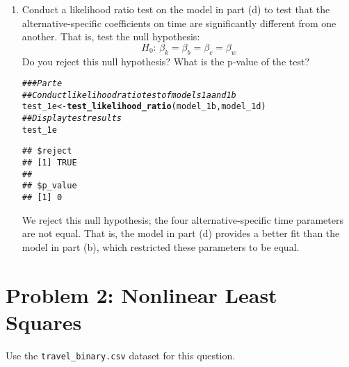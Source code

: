 \documentclass[11pt,letterpaper]{article}\usepackage[]{graphicx}\usepackage[]{color}
\makeatletter
\newcommand{\hlcom}[1]{\textcolor[rgb]{0.678,0.584,0.686}{\textit{#1}}}%
\newcommand{\hlstd}[1]{\textcolor[rgb]{0.345,0.345,0.345}{#1}}%
\newcommand{\hlkwb}[1]{\textcolor[rgb]{0.69,0.353,0.396}{#1}}%
\newcommand{\hlkwd}[1]{\textcolor[rgb]{0.737,0.353,0.396}{\textbf{#1}}}%
\newenvironment{kframe}{%
 \def\at@end@of@kframe{}%
 \ifinner\ifhmode%
  \def\at@end@of@kframe{\end{minipage}}%
  \begin{minipage}{\columnwidth}%
 \fi\fi%
 \def\FrameCommand##1{\hskip\@totalleftmargin \hskip-\fboxsep
 \colorbox{shadecolor}{##1}\hskip-\fboxsep
     \hskip-\linewidth \hskip-\@totalleftmargin \hskip\columnwidth}%
 \MakeFramed {\advance\hsize-\width
   \@totalleftmargin\z@ \linewidth\hsize
   \@setminipage}}%
 {\par\unskip\endMakeFramed%
 \at@end@of@kframe}
\newenvironment{knitrout}{}{} %
\makeatother
\begin{document}
\begin{enumerate}[label=\alph*., leftmargin=*]
	\item Conduct a likelihood ratio test on the model in part (d) to test that the alternative-specific coefficients on time are significantly different from one another. That is, test the null hypothesis:
	$$H_0 \text{: } \beta_k = \beta_b = \beta_c = \beta_w$$
	Do you reject this null hypothesis? What is the p-value of the test?

\begin{knitrout}
\color{fgcolor}\begin{kframe}
\begin{alltt}
\hlcom{### Part e}
\hlcom{## Conduct likelihood ratio test of models 1a and 1b}
\hlstd{test_1e} \hlkwb{<-} \hlkwd{test_likelihood_ratio}\hlstd{(model_1b, model_1d)}
\hlcom{## Display test results}
\hlstd{test_1e}
\end{alltt}
\begin{verbatim}
## $reject
## [1] TRUE
## 
## $p_value
## [1] 0
\end{verbatim}
\end{kframe}
\end{knitrout}

	We reject this null hypothesis; the four alternative-specific time parameters are not equal. That is, the model in part (d) provides a better fit than the model in part (b), which restricted these parameters to be equal.
\end{enumerate}

\section*{Problem 2: Nonlinear Least Squares}

Use the \texttt{travel\_binary.csv} dataset for this question.
\end{document}
